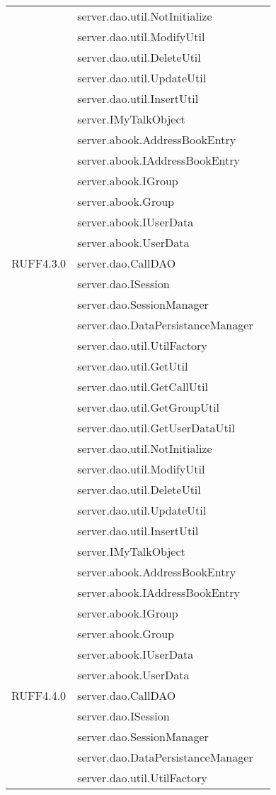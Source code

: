 \begin{center}
\begin{longtable}{lp{}l}
& server.dao.util.NotInitialize\\
& server.dao.util.ModifyUtil\\
& server.dao.util.DeleteUtil\\
& server.dao.util.UpdateUtil\\
& server.dao.util.InsertUtil\\
& server.IMyTalkObject\\
& server.abook.AddressBookEntry\\
& server.abook.IAddressBookEntry\\
& server.abook.IGroup\\
& server.abook.Group\\
& server.abook.IUserData\\
& server.abook.UserData\\
RUFF4.3.0 & server.dao.CallDAO\\
& server.dao.ISession\\
& server.dao.SessionManager\\
& server.dao.DataPersistanceManager\\
& server.dao.util.UtilFactory\\
& server.dao.util.GetUtil\\
& server.dao.util.GetCallUtil\\
& server.dao.util.GetGroupUtil\\
& server.dao.util.GetUserDataUtil\\
& server.dao.util.NotInitialize\\
& server.dao.util.ModifyUtil\\
& server.dao.util.DeleteUtil\\
& server.dao.util.UpdateUtil\\
& server.dao.util.InsertUtil\\
& server.IMyTalkObject\\
& server.abook.AddressBookEntry\\
& server.abook.IAddressBookEntry\\
& server.abook.IGroup\\
& server.abook.Group\\
& server.abook.IUserData\\
& server.abook.UserData\\
RUFF4.4.0 & server.dao.CallDAO\\
& server.dao.ISession\\
& server.dao.SessionManager\\
& server.dao.DataPersistanceManager\\
& server.dao.util.UtilFactory\\

\end{longtable}
\end{center}
